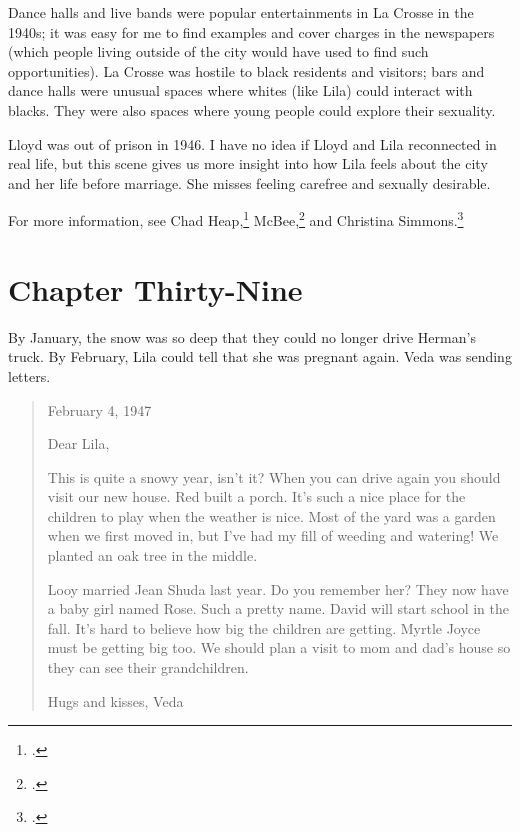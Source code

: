 \documentclass[
  american,
  letterpaper,
]{book}
\begin{document}
Dance halls and live bands were popular entertainments in La Crosse in
the 1940s; it was easy for me to find examples and cover charges in the
newspapers (which people living outside of the city would have used to
find such opportunities). La Crosse was hostile to black residents and
visitors; bars and dance halls were unusual spaces where whites (like
Lila) could interact with blacks. They were also spaces where young
people could explore their sexuality.

Lloyd was out of prison in 1946. I have no idea if Lloyd and Lila
reconnected in real life, but this scene gives us more insight into how
Lila feels about the city and her life before marriage. She misses
feeling carefree and sexually desirable.

For more information, see Chad Heap,\footnote{.} McBee,\footnote{.} and Christina Simmons.\footnote{.}


\chapter{Chapter Thirty-Nine}\label{chapter-thirty-nine}

By January, the snow was so deep that they could no longer drive
Herman's truck. By February, Lila could tell that she was pregnant
again. Veda was sending letters.

\begin{quote}
February 4, 1947

Dear Lila,

This is quite a snowy year, isn't it? When you can drive again you
should visit our new house. Red built a porch. It's such a nice place
for the children to play when the weather is nice. Most of the yard was
a garden when we first moved in, but I've had my fill of weeding and
watering! We planted an oak tree in the middle.

Looy married Jean Shuda last year. Do you remember her? They now have a
baby girl named Rose. Such a pretty name. David will start school in the
fall. It's hard to believe how big the children are getting. Myrtle
Joyce must be getting big too. We should plan a visit to mom and dad's
house so they can see their grandchildren.

Hugs and kisses, Veda
\end{quote}
\end{document}
